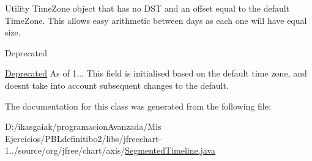 Utility Time\+Zone object that has no D\+ST and an offset equal to the default Time\+Zone. This allows easy arithmetic between days as each one will have equal size.

\begin{DoxyRefDesc}{Deprecated}
\item[\mbox{\hyperlink{deprecated__deprecated000027}{Deprecated}}]As of 1... This field is initialised based on the default time zone, and doesn\textquotesingle{}t take into account subsequent changes to the default. \end{DoxyRefDesc}


The documentation for this class was generated from the following file\+:\begin{DoxyCompactItemize}
\item 
D\+:/ikasgaiak/programacion\+Avanzada/\+Mis Ejercicios/\+P\+B\+Ldefinitibo2/libs/jfreechart-\/1../source/org/jfree/chart/axis/\mbox{\hyperlink{_segmented_timeline_8java}{Segmented\+Timeline.\+java}}\end{DoxyCompactItemize}
